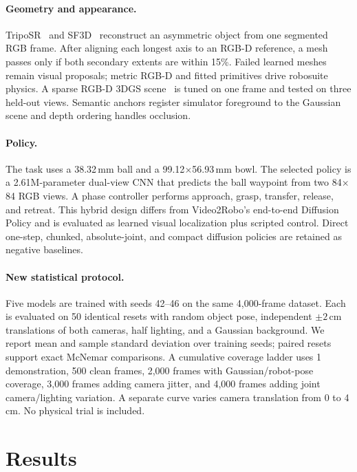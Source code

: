 \documentclass[10pt,twocolumn,letterpaper]{article}
\begin{document}
\paragraph{Geometry and appearance.}
TripoSR~\cite{tochilkin2024triposr} and SF3D~\cite{boss2024sf3d} reconstruct an
asymmetric object from one segmented RGB frame. After aligning each longest axis
to an RGB-D reference, a mesh passes only if both secondary extents are within
15\%. Failed learned meshes remain visual proposals; metric RGB-D and fitted
primitives drive robosuite~\cite{zhu2020robosuite} physics. A sparse RGB-D 3DGS
scene~\cite{kerbl2023gaussians} is tuned on one frame and tested on three held-out
views. Semantic anchors register simulator foreground to the Gaussian scene and
depth ordering handles occlusion.

\paragraph{Policy.}
The task uses a 38.32\,mm ball and a 99.12$\times$56.93\,mm bowl. The selected
policy is a 2.61M-parameter dual-view CNN that predicts the ball waypoint from
two 84$\times$84 RGB views. A phase controller performs approach, grasp,
transfer, release, and retreat. This hybrid design differs from Video2Robo's
end-to-end Diffusion Policy and is evaluated as learned visual localization plus
scripted control. Direct one-step, chunked, absolute-joint, and compact diffusion
policies are retained as negative baselines.

\paragraph{New statistical protocol.}
Five models are trained with seeds 42--46 on the same 4,000-frame dataset. Each
is evaluated on 50 identical resets with random object pose, independent
$\pm2$\,cm translations of both cameras, half lighting, and a Gaussian
background. We report mean and sample standard deviation over training seeds;
paired resets support exact McNemar comparisons. A cumulative coverage ladder
uses 1 demonstration, 500 clean frames, 2,000 frames with Gaussian/robot-pose
coverage, 3,000 frames adding camera jitter, and 4,000 frames adding joint
camera/lighting variation. A separate curve varies camera translation from 0 to
4\,cm. No physical trial is included.

\section{Results}
\end{document}
